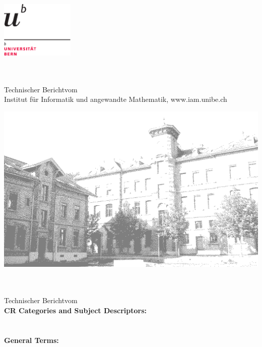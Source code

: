 \documentclass[12pt,a4paper,twoside]{_sty/iam_tr}
\begin{document}
\begin{flushright}
\includegraphics[width=3.5cm]{unibeLogo}
\end{flushright}
\vfill
{\Large \bf \reptitle}\\[0.5cm]
{\large \bf \repshortauthors}\\[0.5cm]
{\large Technischer Bericht\repnumber vom\repdate}\\
\vfill
{\small Institut f\"ur Informatik und angewandte Mathematik, www.iam.unibe.ch}
\begin{flushleft}
\includegraphics[width=16cm]{areal}
\end{flushleft}
\cleardoublepage %
\vspace*{2cm}
{\Large \bf \reptitle}\\[1cm]
{\large \bf \repallauthors}\\[1cm]
{\large Technischer Bericht\repnumber vom\repdate}\\[2cm]
\vfill
\textbf{CR Categories and Subject Descriptors:}\\
\repcategories \\ \\
\textbf{General Terms:}\\
\repterms \\ \\
\end{document}
